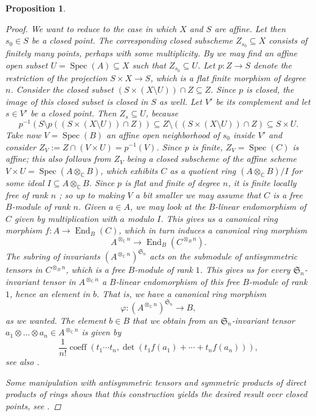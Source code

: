 \documentclass[12pt,a4paper]{amsart}
\theoremstyle{plain}
\newtheorem{prop}[thm]{Proposition}
\theoremstyle{definition}
\theoremstyle{remark}
\begin{document}
\begin{prop}
\begin{proof}
    We want to reduce to the case in which $X$ and $S$ are affine.
    Let then $s_{0} \in S$ be a closed point.
    The corresponding closed subscheme $Z_{s_{0}} \subseteq X$ consists of finitely many points, perhaps with some multiplicity.
    By  we may find an affine open subset $U = \operatorname{Spec}(A) \subseteq X$ such that $Z_{s_{0}} \subseteq U$.
    Let $p \colon Z \to S$ denote the restriction of the projection $S \times X \to S$, which is a flat finite morphism of degree $n$.
    Consider the closed subset $(S \times (X\setminus U)) \cap Z \subseteq Z$.
    Since $p$ is closed, the image of this closed subset is closed in $S$ as well.
    Let $V'$ be its complement and let $s \in V'$ be a closed point.
    Then $Z_{s} \subseteq U$, because
    \[ p^{-1}(S \setminus p((S \times (X \setminus U)) \cap Z)) \subseteq Z \setminus ((S \times (X \setminus U)) \cap Z) \subseteq S \times U. \]
    Take now $V = \operatorname{Spec}(B)$ an affine open neighborhood of $s_{0}$ inside $V'$ and consider $Z_{V} := Z \cap (V \times U) = p^{-1}(V)$.
    Since $p$ is finite, $Z_{V} = \operatorname{Spec}(C)$ is affine; this also follows from $Z_{V}$ being a closed subscheme of the affine scheme $V \times U = \operatorname{Spec}(A \otimes_{\mathbb{C}} B)$, which exhibits $C$ as a quotient ring $(A \otimes_{\mathbb{C}} B)/I$ for some ideal $I \subseteq A \otimes_{\mathbb{C}}B$.
    Since $p$ is flat and finite of degree $n$, it is finite locally free of rank $n$ \cite[\href{https://stacks.math.columbia.edu/tag/02KB}{Tag 02KB}]{stacks-project}; so up to making $V$ a bit smaller we may assume that $C$ is a free $B$-module of rank $n$. 
    Given $a \in A$, we may look at the $B$-linear endomorphism of $C$ given by multiplication with $a$ modulo $I$.
    This gives us a canonical ring morphism $f \colon A \to \operatorname{End}_{B}(C)$, which in turn induces a canonical ring morphism
    \[ A^{\otimes_{\mathbb{C}} n} \to \operatorname{End}_{B}(C^{\otimes_{B} n}). \]
    The subring of invariants $(A^{\otimes_{\mathbb{C}} n})^{\mathfrak{S}_{n}}$ acts on the submodule of antisymmetric tensors in $C^{\otimes_{B} n}$, which is a free $B$-module of rank $1$.
    This gives us for every $\mathfrak{S}_{n}$-invariant tensor in $A^{\otimes_{\mathbb{C}} n}$ a $B$-linear endomorphism of this free $B$-module of rank $1$, hence an element in $b$.
    That is, we have a canonical ring morphism
    \[ \varphi \colon (A^{\otimes_{\mathbb{C}} n})^{\mathfrak{S}_{n}} \to B, \]
    as we wanted.
    The element $b \in B$ that we obtain from an $\mathfrak{S}_{n}$-invariant tensor $a_{1} \otimes \ldots \otimes a_{n} \in A^{\otimes_{\mathbb{C}}n}$ is given by
    \[ \frac{1}{n!}\operatorname{coeff}(t_{1} \cdots t_{n}, \det(t_{1}f(a_{1}) + \cdots + t_{n}f(a_{n}))), \]
    see also \cite[Proposition 2.17]{ber08}.

    Some manipulation with antisymmetric tensors and symmetric products of direct products of rings shows that this construction yields the desired result over closed points, see \cite[p.~9]{leh00}.
  \end{proof}
\end{prop}
\end{document}
